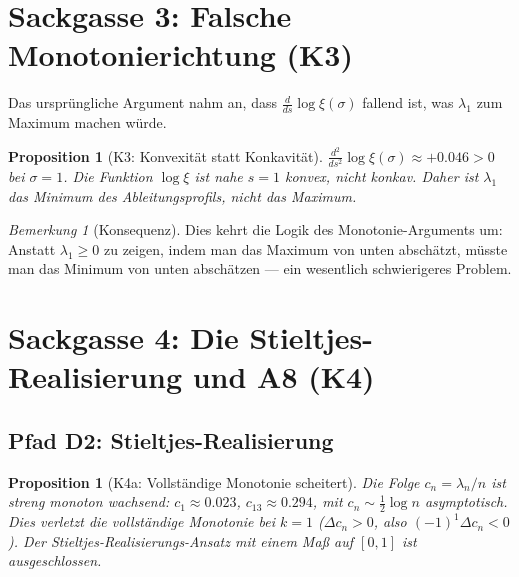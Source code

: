 \documentclass[12pt,a4paper]{article}
\newtheorem{proposition}[theorem]{Proposition}
\theoremstyle{definition}
\theoremstyle{remark}
\newtheorem{remark}[theorem]{Bemerkung}
\begin{document}
\section{Sackgasse 3: Falsche Monotonierichtung (K3)}
\label{sec:K3}

Das ursprüngliche Argument nahm an, dass $\frac{d}{ds}\log\xi(\sigma)$ fallend ist, was $\lambda_1$ zum Maximum machen würde.

\begin{proposition}[K3: Konvexität statt Konkavität]
\label{prop:K3}
$\frac{d^2}{ds^2}\log\xi(\sigma) \approx +0.046 > 0$ bei $\sigma = 1$. Die Funktion $\log\xi$ ist nahe $s = 1$ \emph{konvex}, nicht konkav. Daher ist $\lambda_1$ das \emph{Minimum} des Ableitungsprofils, nicht das Maximum.
\end{proposition}

\begin{remark}[Konsequenz]
Dies kehrt die Logik des Monotonie-Arguments um: Anstatt $\lambda_1 \geq 0$ zu zeigen, indem man das Maximum von unten abschätzt, müsste man das Minimum von unten abschätzen --- ein wesentlich schwierigeres Problem.
\end{remark}


\section{Sackgasse 4: Die Stieltjes-Realisierung und A8 (K4)}
\label{sec:K4}

\subsection{Pfad D2: Stieltjes-Realisierung}

\begin{proposition}[K4a: Vollständige Monotonie scheitert]
Die Folge $c_n = \lambda_n/n$ ist \emph{streng monoton wachsend}: $c_1 \approx 0.023$, $c_{13} \approx 0.294$, mit $c_n \sim \frac{1}{2}\log n$ asymptotisch. Dies verletzt die vollständige Monotonie bei $k = 1$ ($\Delta c_n > 0$, also $(-1)^1\Delta c_n < 0$). Der Stieltjes-Realisierungs-Ansatz mit einem Maß auf $[0,1]$ ist ausgeschlossen.
\end{proposition}
\end{document}
